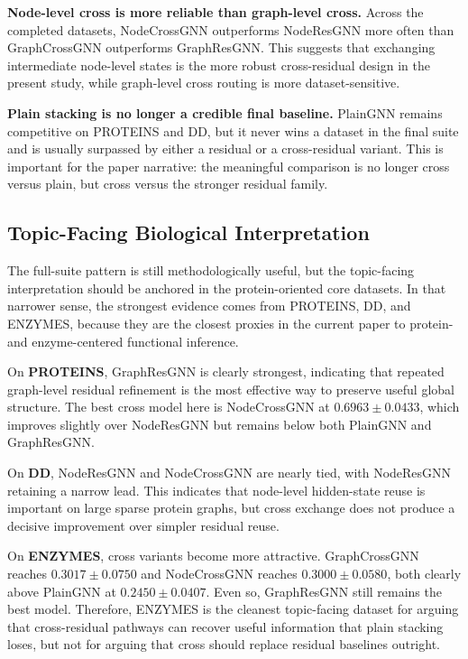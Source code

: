 \textbf{Node-level cross is more reliable than graph-level cross.} Across the completed datasets, NodeCrossGNN outperforms NodeResGNN more often than GraphCrossGNN outperforms GraphResGNN. This suggests that exchanging intermediate node-level states is the more robust cross-residual design in the present study, while graph-level cross routing is more dataset-sensitive.

\textbf{Plain stacking is no longer a credible final baseline.} PlainGNN remains competitive on PROTEINS and DD, but it never wins a dataset in the final suite and is usually surpassed by either a residual or a cross-residual variant. This is important for the paper narrative: the meaningful comparison is no longer cross versus plain, but cross versus the stronger residual family.

\subsection{Topic-Facing Biological Interpretation}

The full-suite pattern is still methodologically useful, but the topic-facing interpretation should be anchored in the protein-oriented core datasets. In that narrower sense, the strongest evidence comes from PROTEINS, DD, and ENZYMES, because they are the closest proxies in the current paper to protein- and enzyme-centered functional inference.

On \textbf{PROTEINS}, GraphResGNN is clearly strongest, indicating that repeated graph-level residual refinement is the most effective way to preserve useful global structure. The best cross model here is NodeCrossGNN at $0.6963 \pm 0.0433$, which improves slightly over NodeResGNN but remains below both PlainGNN and GraphResGNN.

On \textbf{DD}, NodeResGNN and NodeCrossGNN are nearly tied, with NodeResGNN retaining a narrow lead. This indicates that node-level hidden-state reuse is important on large sparse protein graphs, but cross exchange does not produce a decisive improvement over simpler residual reuse.

On \textbf{ENZYMES}, cross variants become more attractive. GraphCrossGNN reaches $0.3017 \pm 0.0750$ and NodeCrossGNN reaches $0.3000 \pm 0.0580$, both clearly above PlainGNN at $0.2450 \pm 0.0407$. Even so, GraphResGNN still remains the best model. Therefore, ENZYMES is the cleanest topic-facing dataset for arguing that cross-residual pathways can recover useful information that plain stacking loses, but not for arguing that cross should replace residual baselines outright.

